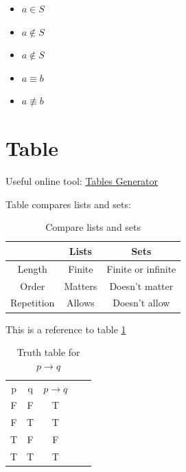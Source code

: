 \documentclass[12pt, letterpaper, oneside]{article}
\begin{document}
\begin{itemize}
  \item $a \in S$
  \item $a \notin S$
  \item $a \not\in S$
  \item $a \equiv b$
  \item $a \not\equiv b$
\end{itemize}

\section{Table}

Useful online tool: \href{https://www.tablesgenerator.com/}{Tables Generator}

Table compares lists and sets:
\begin{table}[H]
  \centering
  \begin{tabular}{||c c c ||}
    \hline
               & Lists   & Sets               \\ [0.5ex]
    \hline
    \hline
    Length     & Finite  & Finite or infinite \\
    Order      & Matters & Doesn't matter     \\
    Repetition & Allows  & Doesn't allow      \\ [1ex]
    \hline
  \end{tabular}
  \caption{Compare lists and sets}
  \label{table:lists_sets_comp}
\end{table}

This is a reference to table \ref{table:lists_sets_comp}

\begin{table}[H]
  \centering
  \begin{tabular}{|c|c|c|ll}
    \cline{1-3}
    p & q & $p \rightarrow q$ &  & \\ [1ex] \cline{1-3}
    F & F & T                 &  & \\ [0.5ex] \cline{1-3}
    F & T & T                 &  & \\ [0.5ex] \cline{1-3}
    T & F & F                 &  & \\ [0.5ex] \cline{1-3}
    T & T & T                 &  & \\ [0.5ex] \cline{1-3}
  \end{tabular}
  \caption{Truth table for $p \rightarrow q$}
\end{table}
\end{document}
